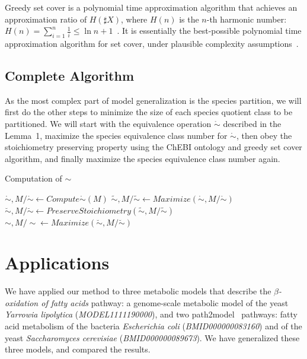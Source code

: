\documentclass[10pt]{bmc_article}
\newenvironment{bmcformat}{\baselineskip20pt\sloppy\setboolean{publ}{false}}{\baselineskip20pt\sloppy}
\begin{document}
\begin{bmcformat}
Greedy set cover is a polynomial time approximation algorithm that achieves an approximation ratio of $H(\sharp X)$, where $H(n)$ is the $n$-th harmonic number: $H(n) = \sum^n_{i = 1}\frac{1}{i} \leq \ln{n} + 1$~\cite{Chvatal1979}. It is essentially the best-possible polynomial time approximation algorithm for set cover, under plausible complexity assumptions~\cite{Lund1994}. 

\subsection*{Complete Algorithm}
As the most complex part of model generalization is the species partition, we will first do the other steps to minimize the size of each species quotient class to be partitioned. We will start with the equivalence operation $\mathring{\sim}$ described in the Lemma~1, maximize the species equivalence class number for $\mathring{\sim}$, then obey the stoichiometry preserving property using the ChEBI ontology and greedy set cover algorithm, and finally maximize the species equivalence class number again.\\

\begin{algorithm}[H]
\SetAlgoVlined
{}
\caption{Computation of ${\sim}$}
\BlankLine
\BlankLine
$\mathring{\sim}, M/\mathring{\sim} \leftarrow Compute\mathring{\sim}(M)$ \;
$\tilde{\sim}, M/\tilde{\sim} \leftarrow Maximize(\mathring{\sim}, M/{\mathring{\sim}})$ \;
$\breve{\sim}, M/\breve{\sim} \leftarrow PreserveStoichiometry(\tilde{\sim}, M/\tilde{\sim})$ \;
$\sim, M/\sim \leftarrow Maximize(\breve{\sim}, M/\breve{\sim})$ \;
\BlankLine
{}
\end{algorithm} 

\section*{Applications}
We have applied our method to three metabolic models that describe the \textit{$\beta$-oxidation of fatty acids} pathway: a genome-scale metabolic model of the yeast \textit{Yarrowia lipolytica} (\emph{MODEL1111190000}), and two path2model~\cite{http://www.ebi.ac.uk/biomodels-main/path2models} pathways: fatty acid metabolism of the bacteria \textit{Escherichia coli} (\emph{BMID000000083160}) and of the yeast \textit{Saccharomyces cerevisiae} (\emph{BMID000000089673}). We have generalized these three models, and compared the results. 


\end{bmcformat}
\end{document}
